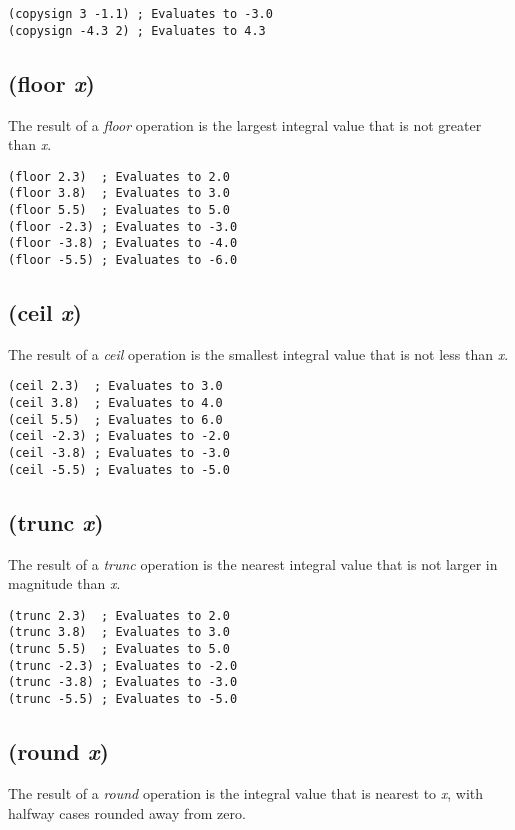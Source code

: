 \documentclass[twoside=false, numbers=noenddot]{scrbook}
\newcommand{\dindex}[1]{\emph{#1}\index{#1}}
\begin{document}
\begin{verbatim}
(copysign 3 -1.1) ; Evaluates to -3.0
(copysign -4.3 2) ; Evaluates to 4.3
\end{verbatim}

\subsection{(floor \emph{x})}
The result of a \dindex{floor} operation is the largest integral value that is not greater than \emph{x}.

\begin{verbatim}
(floor 2.3)  ; Evaluates to 2.0
(floor 3.8)  ; Evaluates to 3.0
(floor 5.5)  ; Evaluates to 5.0
(floor -2.3) ; Evaluates to -3.0
(floor -3.8) ; Evaluates to -4.0
(floor -5.5) ; Evaluates to -6.0
\end{verbatim}

\subsection{(ceil \emph{x})}
The result of a \dindex{ceil} operation is the smallest integral value that is not less than \emph{x}.

\begin{verbatim}
(ceil 2.3)  ; Evaluates to 3.0
(ceil 3.8)  ; Evaluates to 4.0
(ceil 5.5)  ; Evaluates to 6.0
(ceil -2.3) ; Evaluates to -2.0
(ceil -3.8) ; Evaluates to -3.0
(ceil -5.5) ; Evaluates to -5.0
\end{verbatim}

\subsection{(trunc \emph{x})}
The result of a \dindex{trunc} operation is the nearest integral value that is not larger in magnitude than \emph{x}.

\begin{verbatim}
(trunc 2.3)  ; Evaluates to 2.0
(trunc 3.8)  ; Evaluates to 3.0
(trunc 5.5)  ; Evaluates to 5.0
(trunc -2.3) ; Evaluates to -2.0
(trunc -3.8) ; Evaluates to -3.0
(trunc -5.5) ; Evaluates to -5.0
\end{verbatim}

\subsection{(round \emph{x})}
The result of a \dindex{round} operation is the integral value that is nearest to \emph{x}, with halfway cases rounded away from zero.
\end{document}
